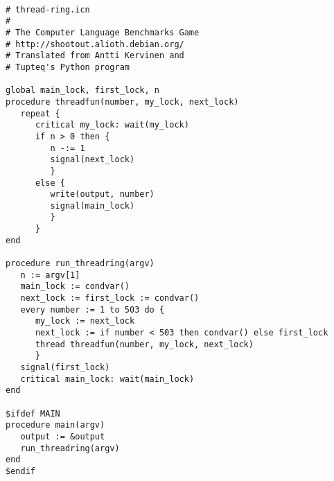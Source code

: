 \documentclass[letterpaper,12pt]{article}
\begin{document}
\begin{verbatim}

# thread-ring.icn
#
# The Computer Language Benchmarks Game
# http://shootout.alioth.debian.org/
# Translated from Antti Kervinen and
# Tupteq's Python program

global main_lock, first_lock, n
procedure threadfun(number, my_lock, next_lock)
   repeat {
      critical my_lock: wait(my_lock)
      if n > 0 then {
         n -:= 1
         signal(next_lock)
         }
      else {
         write(output, number)
         signal(main_lock)
         }
      }
end

procedure run_threadring(argv)
   n := argv[1]
   main_lock := condvar()
   next_lock := first_lock := condvar()
   every number := 1 to 503 do {
      my_lock := next_lock
      next_lock := if number < 503 then condvar() else first_lock
      thread threadfun(number, my_lock, next_lock)
      }
   signal(first_lock)
   critical main_lock: wait(main_lock)
end

$ifdef MAIN
procedure main(argv)
   output := &output
   run_threadring(argv)
end
$endif

\end{verbatim}

\newpage
\end{document}
